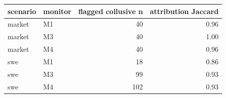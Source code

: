 \begin{tabular}{llrr}
\toprule
scenario & monitor & flagged collusive n & attribution Jaccard \\
\midrule
market & M1 & 40 & 0.96 \\
market & M3 & 40 & 1.00 \\
market & M4 & 40 & 0.96 \\
swe & M1 & 18 & 0.86 \\
swe & M3 & 99 & 0.93 \\
swe & M4 & 102 & 0.93 \\
\bottomrule
\end{tabular}

